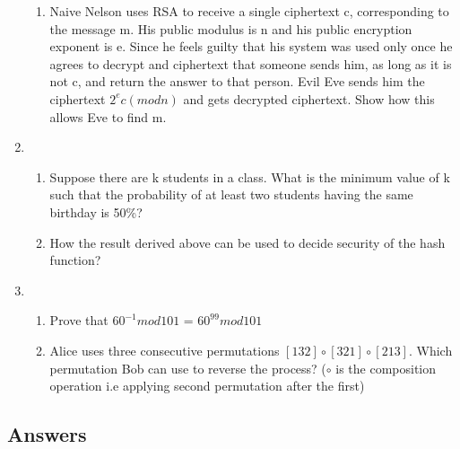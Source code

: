 \documentclass{exmppr}
\begin{document}
\begin{enumerate}
\begin{enumerate}
\item Naive Nelson uses RSA to receive a single ciphertext c, corresponding to the message m. His public modulus is n and his public encryption exponent is e. Since he feels guilty that his system was used only once he agrees to decrypt and ciphertext that someone sends him, as long as it is not c, and return the answer to that person. Evil Eve sends him the ciphertext $2^e c(mod n)$ and gets decrypted ciphertext. Show how this allows Eve to find m.
\end{enumerate}
\item \begin{enumerate}
\item Suppose there are k students in a class. What is the minimum value of k such that the probability of at least two students having the same birthday is 50\%?
\item How the result derived above can be used to decide security of the hash function?
\end{enumerate}

\item \begin{enumerate}
\item Prove that $60^{-1} mod 101$ = $60^{99} mod 101$
\item Alice uses three consecutive permutations $[1 3 2]\circ[3 2 1]\circ[2 1 3]$. Which permutation Bob can use to reverse the process? ($\circ$ is the composition operation i.e applying second permutation after the first)
\end{enumerate}
\end{enumerate}


\newpage
\begin{center}\section*{Answers}\end{center}
%
\end{document}
